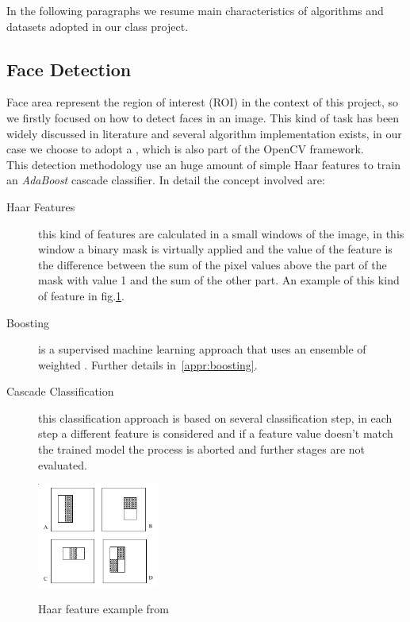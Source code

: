 In the following paragraphs we resume main characteristics of algorithms and datasets adopted in our class project.


\subsection{Face Detection}

Face area represent the region of interest (ROI) in the context of this project, so we firstly focused on how to detect faces in an image. This kind of task has been widely discussed in literature and several algorithm implementation exists, in our case we choose to adopt a \cite{Viola01rapidobject}, which is also part of the OpenCV framework.\\
This detection methodology use an huge amount of simple Haar features to train an \emph{AdaBoost} cascade classifier. In detail the concept involved are:

\begin{description}
\item[Haar Features] this kind of features are calculated in a small windows of the image, in this window a binary mask is virtually applied and the value of the feature is the difference between the sum of the pixel values above the part of the mask with value 1 and the sum of the other part. An example of this kind of feature in fig.\ref{fig:haar}.
\item[Boosting] is a supervised machine learning approach that uses an ensemble of weighted . Further details in~\ref{appr:boosting}.
\item[Cascade Classification] this classification approach is based on several classification step, in each step a different feature is considered and if a feature value doesn't match the trained model the process is aborted and further stages are not evaluated.
\end{description}

\begin{figure}[!b]
\centering
\includegraphics[width=4cm]{images/haarfeatures.png}
\label{fig:haar}
\caption{Haar feature example from \cite{Viola01rapidobject} }
\end{figure}


